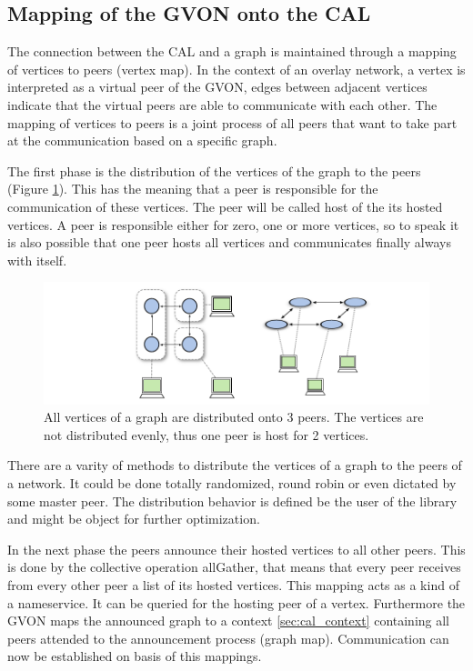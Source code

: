 \subsection{Mapping of the GVON onto the CAL}
\label{sec:mapping}
The connection between the CAL and a graph is maintained through a
mapping of vertices to peers (vertex map). In the context of an
overlay network, a vertex is interpreted as a virtual peer of the GVON,
edges between adjacent vertices indicate that the virtual peers are
able to communicate with each other. The mapping of vertices to peers
is a joint process of all peers that want to take part at the
communication based on a specific graph.

The first phase is the distribution of the vertices of the graph to
the peers (Figure \ref{fig:gon_mapping}). This has the meaning that a
peer is responsible for the communication of these vertices. The peer
will be called host of the its hosted vertices. A peer is responsible
either for zero, one or more vertices, so to speak it is also possible
that one peer hosts all vertices and communicates finally always with
itself.

\begin{figure}[H]
  \centering \includegraphics[width=\textwidth]{graphics/30_gon_mapping}
  \caption{All vertices of a graph are distributed onto 3 peers. The vertices
  are not distributed evenly, thus one peer is host for 2 vertices.}
  \label{fig:gon_mapping}
\end{figure}

There are a varity of methods to distribute the vertices of a graph to
the peers of a network. It could be done totally randomized, round
robin or even dictated by some master peer. The distribution behavior
is defined be the user of the library and might be object for further
optimization.

In the next phase the peers announce their hosted vertices to all
other peers. This is done by the collective operation allGather, that
means that every peer receives from every other peer a list of its
hosted vertices. This mapping acts as a kind of a nameservice. It can
be queried for the hosting peer of a vertex. Furthermore the GVON
maps the announced graph to a context \ref{sec:cal_context} containing
all peers attended to the announcement process (graph map). Communication can now
be established on basis of this mappings.

